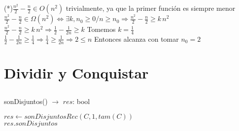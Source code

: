 \documentclass[10pt, a4paper]{article}
\begin{document}
(*)$\frac{n^2}{2} - \frac{n}{2} \in O(n^2)$ trivialmente, ya que la primer función es siempre menor\\
$\frac{n^2}{2} - \frac{n}{2} \in \Omega (n^2) \Leftrightarrow \exists k, n_0 \ge 0 / n\ge n_0 \Rightarrow \frac{n^2}{2} - \frac{n}{2} \ge k \, n^2$\\
$\frac{n^2}{2} - \frac{n}{2} \ge k \, n^2 \Rightarrow  \frac{1}{2} - \frac{1}{2n} \ge k$ Tomemos $k = \frac{1}{4}$\\
$\frac{1}{2} - \frac{1}{2n} \ge \frac{1}{4} \Rightarrow \frac{1}{4} \ge \frac{1}{2n} \Rightarrow 2 \le n$ Entonces alcanza con tomar $n_0 = 2$

\section{Dividir y Conquistar}
\subsection{}

\begin{algorithm}[H]{sonDisjuntos() $\to$ $res$: bool}	
	\begin{algorithmic}[1]
		\State $res \gets sonDisjuntosRec(C, 1, tam(C))$\\
		\Return $res.sonDisjuntos$
    \end{algorithmic}
\end{algorithm}	
\end{document}
